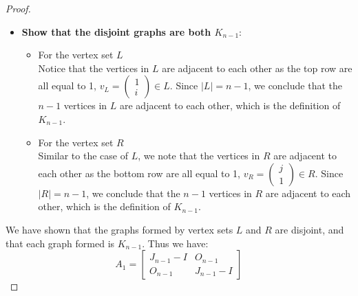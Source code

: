 \begin{proof}
\begin{itemize}
        \item \textbf{Show that the disjoint graphs are both \(K_{n-1}\)}:
        \begin{itemize}
            \item For the vertex set $L$\\
            Notice that the vertices in \(L\) are adjacent to each other as the top row are all equal to 1, \(v_L = \begin{pmatrix} 1 \\ i \end{pmatrix}\in L\). Since \(|L| = n-1\), we conclude that the $n-1$ vertices in $L$ are adjacent to each other, which is the definition of $K_{n-1}$.
            \item For the vertex set $R$\\
            Similar to the case of \(L\), we note that the vertices in \(R\) are adjacent to each other as the bottom row are all equal to 1, \(v_R = \begin{pmatrix} j \\ 1 \end{pmatrix} \in R\). Since \(|R| = n-1\), we conclude that the $n-1$ vertices in $R$ are adjacent to each other, which is the definition of $K_{n-1}$.
        \end{itemize}
    \end{itemize}
     We have shown that the graphs formed by vertex sets \(L\) and \(R\) are disjoint, and that each graph formed is \(K_{n-1}\). Thus we have:
     \begin{equation*}
         A_1 = 
         \begin{bmatrix}
             J_{n-1}-I & O_{n-1} \\
             O_{n-1} & J_{n-1}-I
         \end{bmatrix}
     \end{equation*}
\end{proof}

